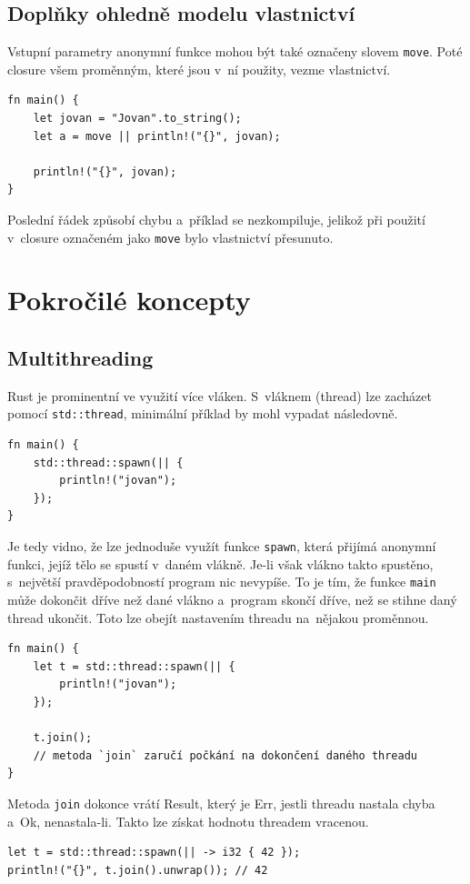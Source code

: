 \documentclass[a4paper, 12pt]{article} %
\newcommand{\rust}[1]{\texttt{#1}}
\begin{document}
            \subsection{Doplňky ohledně modelu vlastnictví}
                Vstupní parametry anonymní funkce mohou být také označeny slovem \rust{move}. Poté closure všem proměnným, které jsou v~ní použity, vezme vlastnictví. 
                \begin{verbatim}
fn main() {
    let jovan = "Jovan".to_string();
    let a = move || println!("{}", jovan);

    println!("{}", jovan);
}
                \end{verbatim}

                Poslední řádek způsobí chybu a~příklad se nezkompiluje, jelikož při použití v~closure označeném jako \rust{move} bylo vlastnictví přesunuto.

\section{Pokročilé koncepty}
    \subsection{Multithreading}
        Rust je prominentní ve využití více vláken. S~vláknem (thread) lze zacházet pomocí \rust{std::thread}, minimální příklad by mohl vypadat následovně.
        \begin{verbatim}
fn main() {
    std::thread::spawn(|| {
        println!("jovan");
    });
}
        \end{verbatim}
        
        Je tedy vidno, že lze jednoduše využít funkce \rust{spawn}, která přijímá anonymní funkci, jejíž tělo se spustí v~daném vlákně. Je-li však vlákno takto spustěno, s~největší pravděpodobností program nic nevypíše. To je tím, že funkce \rust{main} může dokončit dříve než dané vlákno a~program skončí dříve, než se stihne daný thread ukončit. Toto lze obejít nastavením threadu na~nějakou proměnnou.
        \begin{verbatim}
fn main() {
    let t = std::thread::spawn(|| {
        println!("jovan");
    });
    
    t.join();
    // metoda `join` zaručí počkání na dokončení daného threadu
}
        \end{verbatim}
        
        Metoda \rust{join} dokonce vrátí Result, který je Err, jestli threadu nastala chyba a~Ok, nenastala-li. Takto lze získat hodnotu threadem vracenou.
        \begin{verbatim}
let t = std::thread::spawn(|| -> i32 { 42 });
println!("{}", t.join().unwrap()); // 42
        \end{verbatim}
        
\end{document}
